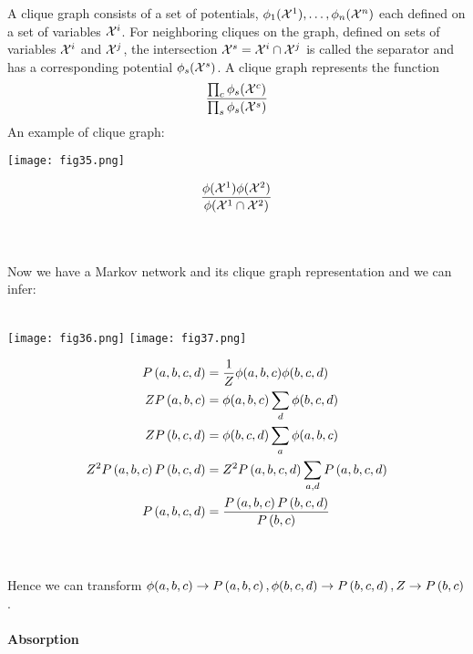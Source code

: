 A clique graph consists of a set of potentials, $\phi_1(\mathcal{X}^1),\dotsc,\phi_n(\mathcal{X}^n)$ each defined on a set of variables $\mathcal{X}^i$. For neighboring cliques on the graph, defined on sets of variables $\mathcal{X}^i$ and $\mathcal{X}^j$, the intersection $\mathcal{X}^s=\mathcal{X}^i\cap\mathcal{X}^j$ is called the separator and has a corresponding potential $\phi_s(\mathcal{X}^s)$. A clique graph represents the function
\begin{align*}
\frac{\prod_c\phi_s(\mathcal{X}^c)}{\prod_s\phi_s(\mathcal{X}^s)}
\end{align*}
An example of clique graph:

\begin{minipage}{0.4\textwidth}
	\centering
	\texttt{[image: fig35.png]}
\end{minipage}
\begin{minipage}{0.6\textwidth}
	\begin{align*}
	\frac{\phi(\mathcal{X}^1)\phi(\mathcal{X}^2)}{\phi(\mathcal{X}^1\cap\mathcal{X}^2)}
	\end{align*}
\end{minipage}
\\ \\
Now we have a Markov network and its clique graph representation and we can infer:
\\ \\
\begin{minipage}{0.4\textwidth}
	\centering
	\texttt{[image: fig36.png]}
	\newline\newline
	\texttt{[image: fig37.png]}
\end{minipage}
\begin{minipage}{0.6\textwidth}
	\begin{align*}
	P\left(a,b,c,d\right)&=\frac{1}{Z}\phi(a,b,c)\phi(b,c,d) \\
	ZP\left(a,b,c\right)&=\phi(a,b,c)\sum_d\phi(b,c,d) \\
	ZP\left(b,c,d\right)&=\phi(b,c,d)\sum_a\phi(a,b,c) \\
	Z^2P\left(a,b,c\right)P\left(b,c,d\right)&=Z^2P\left(a,b,c,d\right)\sum_{a,d}P\left(a,b,c,d\right) \\
	P\left(a,b,c,d\right)&=\frac{P\left(a,b,c\right)P\left(b,c,d\right)}{P\left(b,c\right)}
	\end{align*}
\end{minipage}
\\ \\
Hence we can transform $\phi(a,b,c)\to P\left(a,b,c\right),\phi(b,c,d)\to P\left(b,c,d\right),Z\to P\left(b,c\right)$.

\paragraph{Absorption}


